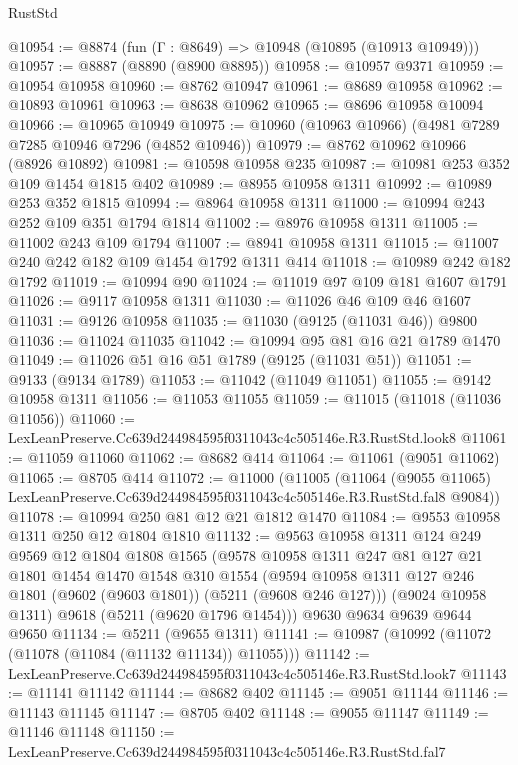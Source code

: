 \begin{lexlean}{RustStd}
\begin{coremodule}
@10954 := @8874 (fun (Γ : @8649) => @10948 (@10895 (@10913 @10949)))
@10957 := @8887 (@8890 (@8900 @8895))
@10958 := @10957 @9371
@10959 := @10954 @10958
@10960 := @8762 @10947
@10961 := @8689 @10958
@10962 := @10893 @10961
@10963 := @8638 @10962
@10965 := @8696 @10958 @10094
@10966 := @10965 @10949
@10975 := @10960 (@10963 @10966) (@4981 @7289 @7285 @10946 @7296 (@4852 @10946))
@10979 := @8762 @10962 @10966 (@8926 @10892)
@10981 := @10598 @10958 @235
@10987 := @10981 @253 @352 @109 @1454 @1815 @402
@10989 := @8955 @10958 @1311
@10992 := @10989 @253 @352 @1815
@10994 := @8964 @10958 @1311
@11000 := @10994 @243 @252 @109 @351 @1794 @1814
@11002 := @8976 @10958 @1311
@11005 := @11002 @243 @109 @1794
@11007 := @8941 @10958 @1311
@11015 := @11007 @240 @242 @182 @109 @1454 @1792 @1311 @414
@11018 := @10989 @242 @182 @1792
@11019 := @10994 @90
@11024 := @11019 @97 @109 @181 @1607 @1791
@11026 := @9117 @10958 @1311
@11030 := @11026 @46 @109 @46 @1607
@11031 := @9126 @10958
@11035 := @11030 (@9125 (@11031 @46)) @9800
@11036 := @11024 @11035
@11042 := @10994 @95 @81 @16 @21 @1789 @1470
@11049 := @11026 @51 @16 @51 @1789 (@9125 (@11031 @51))
@11051 := @9133 (@9134 @1789)
@11053 := @11042 (@11049 @11051)
@11055 := @9142 @10958 @1311
@11056 := @11053 @11055
@11059 := @11015 (@11018 (@11036 @11056))
@11060 := LexLeanPreserve.Cc639d244984595f0311043c4c505146e.R3.RustStd.look8
@11061 := @11059 @11060
@11062 := @8682 @414
@11064 := @11061 (@9051 @11062)
@11065 := @8705 @414
@11072 := @11000
    (@11005
      (@11064
        (@9055 @11065)
        LexLeanPreserve.Cc639d244984595f0311043c4c505146e.R3.RustStd.fal8
        @9084))
@11078 := @10994 @250 @81 @12 @21 @1812 @1470
@11084 := @9553 @10958 @1311 @250 @12 @1804 @1810
@11132 := @9563
    @10958
    @1311
    @124
    @249
    @9569
    @12
    @1804
    @1808
    @1565
    (@9578
      @10958
      @1311
      @247
      @81
      @127
      @21
      @1801
      @1454
      @1470
      @1548
      @310
      @1554
      (@9594 @10958 @1311 @127 @246 @1801 (@9602 (@9603 @1801)) (@5211 (@9608 @246 @127)))
      (@9024 @10958 @1311)
      @9618
      (@5211 (@9620 @1796 @1454)))
    @9630
    @9634
    @9639
    @9644
    @9650
@11134 := @5211 (@9655 @1311)
@11141 := @10987 (@10992 (@11072 (@11078 (@11084 (@11132 @11134)) @11055)))
@11142 := LexLeanPreserve.Cc639d244984595f0311043c4c505146e.R3.RustStd.look7
@11143 := @11141 @11142
@11144 := @8682 @402
@11145 := @9051 @11144
@11146 := @11143 @11145
@11147 := @8705 @402
@11148 := @9055 @11147
@11149 := @11146 @11148
@11150 := LexLeanPreserve.Cc639d244984595f0311043c4c505146e.R3.RustStd.fal7

\end{coremodule}
\end{lexlean}
